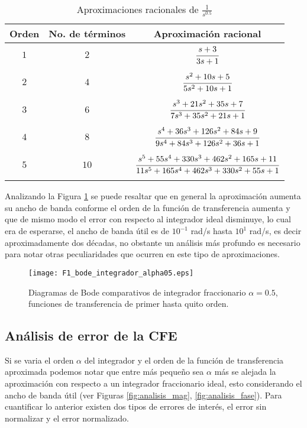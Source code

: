 	\begin{table}[!hbp]
		\caption{Aproximaciones racionales de $\frac{1}{s^{0.5}}$}
		\label{tab:aprox_cfe_alpha_0.5}
		\centering
		\begin{tabular}{c c c}
			\hline
			\textbf{Orden} &  \textbf{No. de términos} & \textbf{Aproximación racional}\\
			\hline
			$1$ 		& $2$ 		&  $\cfrac{s + 3}{3s + 1}$\\
					 		& 		 		& \\
			$2$			& $4$ 		&  $\cfrac{s^{2} + 10s + 5}{5 s^{2} + 10s + 1}$\\
							& 		 		& \\
			$3$ 		& $6$ 		&  $\cfrac{s^{3} + 21s^{2} + 35s + 7}{7 s^3 + 35 s^2 + 21 s + 1}$	\\
							& 		 		& \\
			$4$ 		& $8$ 		&  $\cfrac{s^4 + 36 s^3 + 126 s^2 + 84 s + 9}{9 s^4 + 84 s^3 + 126 s^2 + 36 s + 1}$\\
							& 		 		& \\
			$5$ 		& $10$ 		&  $\cfrac{s^5 + 55 s^4 + 330 s^3 + 462 s^2 + 165 s + 11}{11 s^5 + 165 s^4 + 462 s^3 + 330 s^2 + 55 s + 1}$\\
							& 		 		& \\
			\hline
		\end{tabular}
	\end{table}
	
	Analizando la Figura \ref{fig:F1_bode_integrador_alpha05} se puede resaltar que en general la aproximación aumenta su ancho de banda conforme el orden de la función de transferencia aumenta y que de mismo modo el error con respecto al integrador ideal disminuye, lo cual era de esperarse, el ancho de banda útil es de $10^{-1}$ rad/s hasta $10^{1}$ rad/s, es decir aproximadamente dos décadas, no obstante un análisis más profundo es necesario para notar otras peculiaridades que ocurren en este tipo de aproximaciones.
	
	\begin{figure}[hbtp]
		\caption{Diagramas de Bode comparativos de integrador fraccionario $\alpha = 0.5$, funciones de transferencia de primer hasta quito orden.} 
		\label{fig:F1_bode_integrador_alpha05}
		\centering
		\texttt{[image: F1\_bode\_integrador\_alpha05.eps]}
	\end{figure}
	
	\subsection{Análisis de error de la CFE}
	Si se varia el orden $\alpha$ del integrador y el orden de la función de transferencia aproximada podemos notar que entre más pequeño sea $\alpha$ más se alejada la aproximación con respecto a un integrador fraccionario ideal, esto considerando el ancho de banda útil (ver Figuras \ref{fig:analisis_mag}, \ref{fig:analisis_fase}). Para cuantificar lo anterior existen dos tipos de errores de interés, el error sin normalizar y el error normalizado.
	
